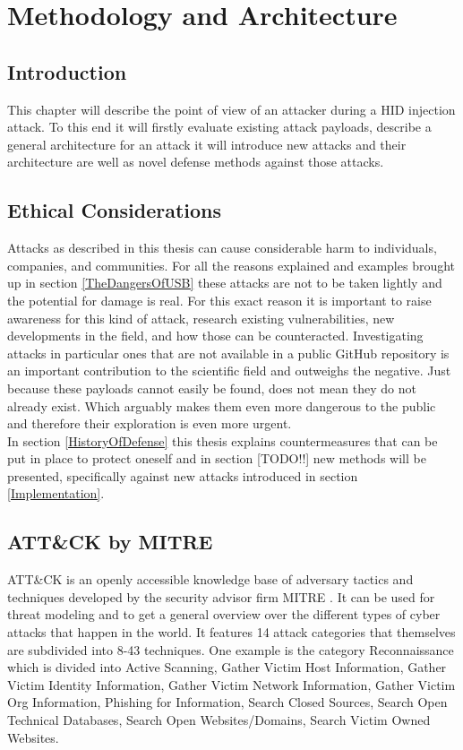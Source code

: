 \chapter{Methodology and Architecture} \label{Methodology}

\section{Introduction}

This chapter will describe the point of view of an attacker during a HID injection attack. To this end it will firstly evaluate existing attack payloads, describe a general architecture for an attack  it will introduce new attacks and their architecture are well as novel defense methods against those attacks. 


\section{Ethical Considerations}
Attacks as described in this thesis can cause considerable harm to individuals, companies, and communities. For all the reasons explained and examples brought up in section \ref{TheDangersOfUSB} these attacks are not to be taken lightly and the potential for damage is real. For this exact reason it is important to raise awareness for this kind of attack, research existing vulnerabilities, new developments in the field, and how those can be counteracted. Investigating attacks in particular ones that are not available in a public GitHub repository is an important contribution to the scientific field and outweighs the negative. Just because these payloads cannot easily be found, does not mean they do not already exist. Which arguably makes them even more dangerous to the public and therefore their exploration is even more urgent. \\
In section \ref{HistoryOfDefense} this thesis explains countermeasures that can be put in place to protect oneself and in section [TODO!!] new methods will be presented, specifically against new attacks introduced in section \ref{Implementation}.


\section{ATT\&CK by MITRE}

ATT\&CK \cite{MITREATTCK} is an openly accessible knowledge base of adversary tactics and techniques developed by the security advisor firm MITRE \cite{WhoWeAre}. It can be used for threat modeling and to get a general overview over the different types of cyber attacks that happen in the world.
It features 14 attack categories that themselves are subdivided into 8-43 techniques. One example is the category Reconnaissance which is divided into Active Scanning, Gather Victim Host Information, Gather Victim Identity Information, Gather Victim Network Information, Gather Victim Org Information, Phishing for Information, Search Closed Sources, Search Open Technical Databases, Search Open Websites/Domains, Search Victim Owned Websites. 




